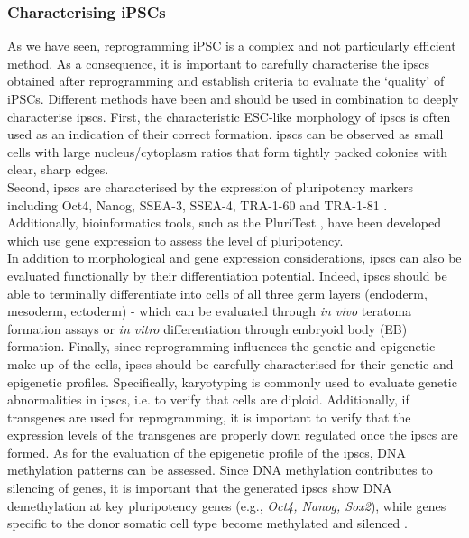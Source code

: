 \subsubsection{Characterising iPSCs}
\label{sec:ipsc_characterise}

As we have seen, reprogramming iPSC is a complex and not particularly efficient method.
As a consequence, it is important to carefully characterise the \glspl{ipsc} obtained after reprogramming \cite{brouwer2016choices} and establish criteria to evaluate the `quality' of iPSCs.
Different methods have been and should be used in combination to deeply characterise \glspl{ipsc}. 
First, the characteristic ESC-like morphology of \glspl{ipsc} is often used as an indication of their correct formation. 
\glspl{ipsc} can be observed as small cells with large nucleus/cytoplasm ratios that form tightly packed colonies with clear, sharp edges. \\

Second, \glspl{ipsc} are characterised by the expression of pluripotency markers including Oct4, Nanog, SSEA-3, SSEA-4, TRA-1-60 and TRA-1-81 \cite{boulting2011functionally}.
Additionally, bioinformatics tools, such as the PluriTest \cite{muller2011bioinformatic}, have been developed which use gene expression to assess the level of pluripotency. \\

In addition to morphological and gene expression considerations, \glspl{ipsc} can also be evaluated functionally by their differentiation potential.
Indeed, \glspl{ipsc} should be able to terminally differentiate into cells of all three germ layers (endoderm, mesoderm, ectoderm) - which can be evaluated through \textit{in vivo} teratoma formation assays or \textit{in vitro} differentiation through embryoid body (EB) formation.
Finally, since reprogramming influences the genetic and epigenetic make-up of the cells, \glspl{ipsc} should be carefully characterised for their genetic and epigenetic profiles.
Specifically, karyotyping is commonly used to evaluate genetic abnormalities in \glspl{ipsc}, i.e. to verify that cells are diploid. 
Additionally, if transgenes are used for reprogramming, it is important to verify that the expression levels of the transgenes are properly down regulated once the \glspl{ipsc} are formed. 
As for the evaluation of the epigenetic profile of the \glspl{ipsc}, DNA methylation patterns can be assessed. 
Since DNA methylation contributes to silencing of genes, it is important that the generated \glspl{ipsc} show DNA demethylation at key pluripotency genes (e.g., \textit{Oct4, Nanog, Sox2}), while genes specific to the donor somatic cell type become methylated and silenced \cite{brouwer2016choices, omole2018ten}. 

